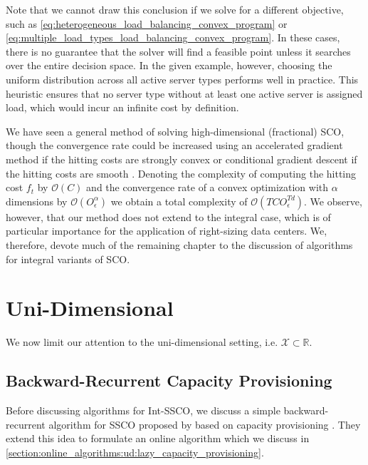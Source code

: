 Note that we cannot draw this conclusion if we solve for a different objective, such as \autoref{eq:heterogeneous_load_balancing_convex_program} or \autoref{eq:multiple_load_types_load_balancing_convex_program}. In these cases, there is no guarantee that the solver will find a feasible point unless it searches over the entire decision space. In the given example, however, choosing the uniform distribution across all active server types performs well in practice. This heuristic ensures that no server type without at least one active server is assigned load, which would incur an infinite cost by definition.

We have seen a general method of solving high-dimensional (fractional) SCO, though the convergence rate could be increased using an accelerated gradient method if the hitting costs are strongly convex or conditional gradient descent if the hitting costs are smooth \cite{Bubeck2015}. Denoting the complexity of computing the hitting cost $f_t$ by $\mathcal{O}(C)$ and the convergence rate of a convex optimization with $\alpha$ dimensions by $\mathcal{O}(O_{\epsilon}^{\alpha})$ we obtain a total complexity of $\mathcal{O}(T C O_{\epsilon}^{T d})$. We observe, however, that our method does not extend to the integral case, which is of particular importance for the application of right-sizing data centers. We, therefore, devote much of the remaining chapter to the discussion of algorithms for integral variants of SCO.

\section{Uni-Dimensional}

We now limit our attention to the uni-dimensional setting, i.e. $\mathcal{X} \subset \mathbb{R}$.

\subsection{Backward-Recurrent Capacity Provisioning}\label{section:offline_algorithms:ud:capacity_provisioning}

Before discussing algorithms for Int-SSCO, we discuss a simple backward-recurrent algorithm for SSCO proposed by \citeauthor*{Lin2011} based on capacity provisioning \cite{Lin2011}. They extend this idea to formulate an online algorithm which we discuss in \autoref{section:online_algorithms:ud:lazy_capacity_provisioning}.

